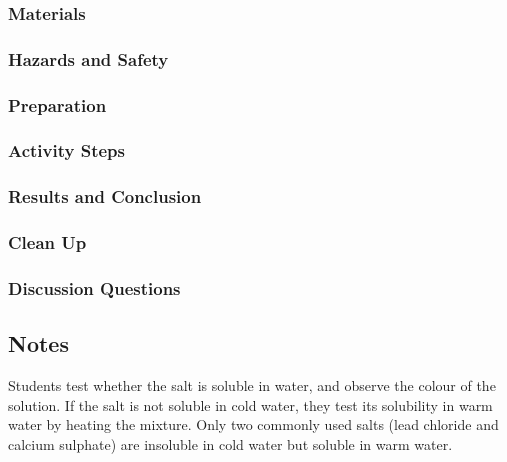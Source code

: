 \subsubsection{Materials}


\subsubsection{Hazards and Safety}


\subsubsection{Preparation}
\begin{enumerate}
\end{enumerate}

\subsubsection{Activity Steps}
\begin{enumerate}
\end{enumerate}

\subsubsection{Results and Conclusion}


\subsubsection{Clean Up}
\begin{enumerate}
\end{enumerate}


\subsubsection{Discussion Questions}
\begin{enumerate}
\end{enumerate}

\subsection{Notes}

Students test whether the salt is soluble in water, 
and observe the colour of the solution. 
If the salt is not soluble in cold water, 
they test its solubility in warm water by heating the mixture. 
Only two commonly used salts 
(lead chloride and calcium sulphate) are insoluble in cold water 
but soluble in warm water. 


